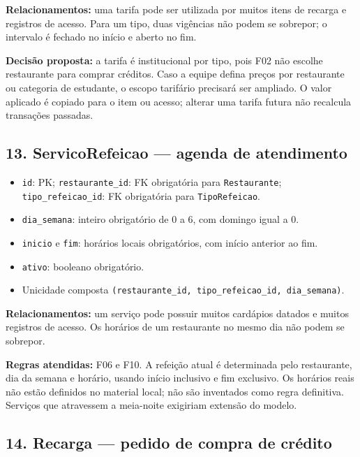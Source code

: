\documentclass[
  brazilian,
  12pt,
  a4paper,
]{article}
\providecommand{\tightlist}{%
  \setlength{\itemsep}{0pt}\setlength{\parskip}{0pt}}
\begin{document}
\textbf{Relacionamentos:} uma tarifa pode ser utilizada por muitos itens
de recarga e registros de acesso. Para um tipo, duas vigências não podem
se sobrepor; o intervalo é fechado no início e aberto no fim.

\textbf{Decisão proposta:} a tarifa é institucional por tipo, pois F02
não escolhe restaurante para comprar créditos. Caso a equipe defina
preços por restaurante ou categoria de estudante, o escopo tarifário
precisará ser ampliado. O valor aplicado é copiado para o item ou
acesso; alterar uma tarifa futura não recalcula transações passadas.

\subsection{13. ServicoRefeicao --- agenda de
atendimento}\label{servicorefeicao-agenda-de-atendimento}

\begin{itemize}
\tightlist
\item
  \texttt{id}: PK; \texttt{restaurante\_id}: FK obrigatória para
  \texttt{Restaurante}; \texttt{tipo\_refeicao\_id}: FK obrigatória para
  \texttt{TipoRefeicao}.
\item
  \texttt{dia\_semana}: inteiro obrigatório de 0 a 6, com domingo igual
  a 0.
\item
  \texttt{inicio} e \texttt{fim}: horários locais obrigatórios, com
  início anterior ao fim.
\item
  \texttt{ativo}: booleano obrigatório.
\item
  Unicidade composta
  \texttt{(restaurante\_id,\ tipo\_refeicao\_id,\ dia\_semana)}.
\end{itemize}

\textbf{Relacionamentos:} um serviço pode possuir muitos cardápios
datados e muitos registros de acesso. Os horários de um restaurante no
mesmo dia não podem se sobrepor.

\textbf{Regras atendidas:} F06 e F10. A refeição atual é determinada
pelo restaurante, dia da semana e horário, usando início inclusivo e fim
exclusivo. Os horários reais não estão definidos no material local; não
são inventados como regra definitiva. Serviços que atravessem a
meia-noite exigiriam extensão do modelo.

\subsection{14. Recarga --- pedido de compra de
crédito}\label{recarga-pedido-de-compra-de-cruxe9dito}
\end{document}
